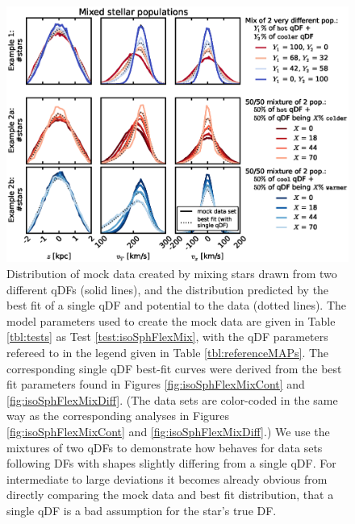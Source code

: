 

\begin{figure}[!htbp]
\centering
\includegraphics[width=\columnwidth]{figs/isoSphFlexMix_mockdata_residuals_2.eps}
\caption{Distribution of mock data created by mixing stars drawn from two different qDFs (solid lines), and the distribution predicted by the best fit of a single qDF and potential to the data (dotted lines). The model parameters used to create the mock data are given in Table \ref{tbl:tests} as Test \ref{test:isoSphFlexMix}, with the qDF parameters refereed to in the legend given in Table \ref{tbl:referenceMAPs}. The corresponding single qDF best-fit curves were derived from the best fit parameters found in Figures \ref{fig:isoSphFlexMixCont} and \ref{fig:isoSphFlexMixDiff}. (The data sets are color-coded in the same way as the corresponding analyses in Figures  \ref{fig:isoSphFlexMixCont} and \ref{fig:isoSphFlexMixDiff}.) We use the mixtures of two qDFs to demonstrate how \RM{} behaves for data sets following DFs with shapes slightly differing from a single qDF. For intermediate to large deviations it becomes already obvious from directly comparing the mock data and best fit distribution, that a single qDF is a bad assumption for the star's true DF. }
\label{fig:isoSphFlexMix_mockdata_residuals}
\end{figure}


